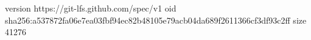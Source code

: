 version https://git-lfs.github.com/spec/v1
oid sha256:a537872fa06e7ea03fbf94ec82b48105e79acb04da689f2611366cf3df93c2ff
size 41276
